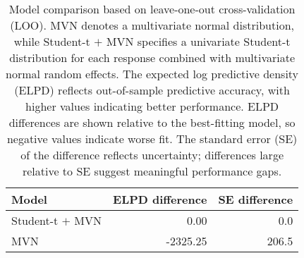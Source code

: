 \begin{table}

\caption{\label{tab:elpd}Model comparison based on leave-one-out cross-validation (LOO).  MVN denotes a multivariate normal distribution, while Student-t $+$ MVN specifies a univariate Student-t distribution for each response combined with multivariate normal random effects.
  The expected log predictive density (ELPD) reflects out-of-sample predictive accuracy, with higher values indicating better performance. ELPD differences are shown relative to the best-fitting model, so negative values indicate worse fit. The standard error (SE) of the difference reflects uncertainty; differences large relative to SE suggest meaningful performance gaps.}
\centering
\begin{tabular}[t]{lrr}
\toprule
Model & ELPD difference & SE difference\\
\midrule
Student-t $+$ MVN & 0.00 & 0.0\\
MVN & -2325.25 & 206.5\\
\bottomrule
\end{tabular}
\end{table}
